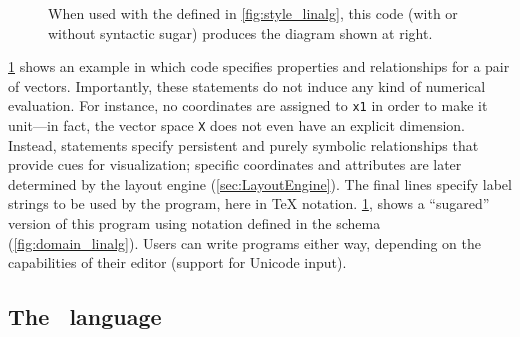 \begin{figure}
\begin{minipage}[!t]{150pt}
\end{minipage}
   \caption{When used with the \Style{} defined in \cref{fig:style_linalg}, this \Substance{} code (with or without syntactic sugar) produces the diagram shown at right.\label{fig:substance_linalg}}
\end{figure}

\cref{fig:substance_linalg} shows an example in which \Substance{} code specifies properties and relationships for a pair of vectors.  Importantly, these statements do not induce any kind of numerical evaluation.  For instance, no coordinates are assigned to \texttt{x1} in order to make it unit---in fact, the vector space \texttt{X} does not even have an explicit dimension.  Instead, statements specify persistent and purely symbolic relationships that provide cues for visualization;  specific coordinates and attributes are later determined by the layout engine (\cref{sec:LayoutEngine}). The final lines specify label strings to be used by the \Style{} program, here in \TeX{} notation.  \cref{fig:substance_linalg},  shows a ``sugared'' version of this program using notation defined in the \Domain{} schema (\cref{fig:domain_linalg}).  Users can write programs either way, depending on the capabilities of their editor (\eg support for Unicode input).


\subsection{The \Style\ language}
\label{sec:TheStyleLanguage}



